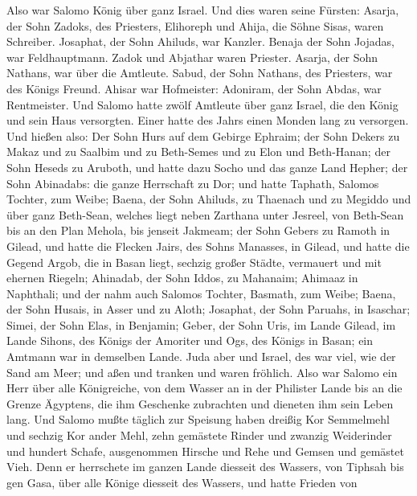  Also war Salomo König über ganz Israel.  Und
dies waren seine Fürsten: Asarja, der Sohn Zadoks, des Priesters,
 Elihoreph und Ahija, die Söhne Sisas, waren Schreiber.
Josaphat, der Sohn Ahiluds, war Kanzler.  Benaja der Sohn
Jojadas, war Feldhauptmann. Zadok und Abjathar waren Priester.
 Asarja, der Sohn Nathans, war über die Amtleute. Sabud, der
Sohn Nathans, des Priesters, war des Königs Freund.  Ahisar
war Hofmeister: Adoniram, der Sohn Abdas, war Rentmeister. 
Und Salomo hatte zwölf Amtleute über ganz Israel, die den König und sein
Haus versorgten. Einer hatte des Jahrs einen Monden lang zu versorgen.
 Und hießen also: Der Sohn Hurs auf dem Gebirge Ephraim;
 der Sohn Dekers zu Makaz und zu Saalbim und zu Beth-Semes
und zu Elon und Beth-Hanan;  der Sohn Heseds zu Aruboth,
und hatte dazu Socho und das ganze Land Hepher;  der Sohn
Abinadabs: die ganze Herrschaft zu Dor; und hatte Taphath, Salomos
Tochter, zum Weibe;  Baena, der Sohn Ahiluds, zu Thaenach
und zu Megiddo und über ganz Beth-Sean, welches liegt neben Zarthana
unter Jesreel, von Beth-Sean bis an den Plan Mehola, bis jenseit
Jakmeam;  der Sohn Gebers zu Ramoth in Gilead, und hatte
die Flecken Jairs, des Sohns Manasses, in Gilead, und hatte die Gegend
Argob, die in Basan liegt, sechzig großer Städte, vermauert und mit
ehernen Riegeln;  Ahinadab, der Sohn Iddos, zu Mahanaim;
 Ahimaaz in Naphthali; und der nahm auch Salomos Tochter,
Basmath, zum Weibe;  Baena, der Sohn Husais, in Asser und
zu Aloth;  Josaphat, der Sohn Paruahs, in Isaschar;
 Simei, der Sohn Elas, in Benjamin;  Geber,
der Sohn Uris, im Lande Gilead, im Lande Sihons, des Königs der Amoriter
und Ogs, des Königs in Basan; ein Amtmann war in demselben Lande.
 Juda aber und Israel, des war viel, wie der Sand am Meer;
und aßen und tranken und waren fröhlich.  Also war Salomo
ein Herr über alle Königreiche, von dem Wasser an in der Philister Lande
bis an die Grenze Ägyptens, die ihm Geschenke zubrachten und dieneten
ihm sein Leben lang.  Und Salomo mußte täglich zur Speisung
haben dreißig Kor Semmelmehl und sechzig Kor ander Mehl, 
zehn gemästete Rinder und zwanzig Weiderinder und hundert Schafe,
ausgenommen Hirsche und Rehe und Gemsen und gemästet Vieh. 
Denn er herrschete im ganzen Lande diesseit des Wassers, von Tiphsah bis
gen Gasa, über alle Könige diesseit des Wassers, und hatte Frieden von
